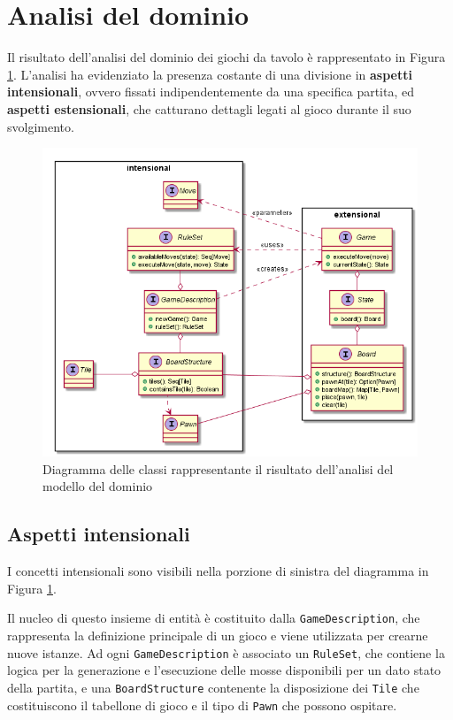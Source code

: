 \section{Analisi del dominio}

Il risultato dell'analisi del dominio dei giochi da tavolo è rappresentato in Figura \ref{fig:domain_analysis}.
%
L'analisi ha evidenziato la presenza costante di una divisione in \textbf{aspetti intensionali}, ovvero fissati indipendentemente da una specifica partita, ed \textbf{aspetti estensionali}, che catturano dettagli legati al gioco durante il suo svolgimento.

\begin{figure}
  \centering
  \includegraphics[width=\linewidth]{images/uml/domain_analysis.png}
  \caption{Diagramma delle classi rappresentante il risultato dell'analisi del modello del dominio}
  \label{fig:domain_analysis}
\end{figure}

\subsection{Aspetti intensionali}
I concetti intensionali sono visibili nella porzione di sinistra del diagramma in Figura \ref{fig:domain_analysis}.

Il nucleo di questo insieme di entità è costituito dalla \texttt{GameDescription}, che rappresenta la definizione principale di un gioco e viene utilizzata per crearne nuove istanze.
%
Ad ogni \texttt{GameDescription} è associato un \texttt{RuleSet}, che contiene la logica per la generazione e l'esecuzione delle mosse disponibili per un dato stato della partita, e una \texttt{BoardStructure} contenente la disposizione dei \texttt{Tile} che costituiscono il tabellone di gioco e il tipo di \texttt{Pawn} che possono ospitare.

